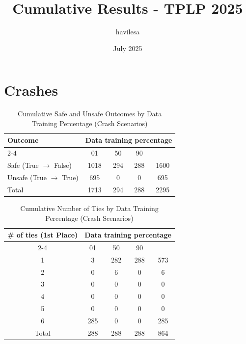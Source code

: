 \documentclass{article}
\title{Cumulative Results - TPLP 2025}
\author{havilesa}
\date{July 2025}
\begin{document}
\maketitle

\section{Crashes}
\begin{table}[h]
\centering
\caption{Cumulative Safe and Unsafe Outcomes by Data Training Percentage (Crash Scenarios)}
\begin{tabular}{l|ccc|c}
\toprule
\multirow{2}{*}{Outcome} & \multicolumn{5}{c|}{Data training percentage} & \multirow{2}{*}{Total} \\
\cmidrule{2-4}
 & 01 & 50 & 90 & \\
\midrule
Safe (True $\rightarrow$ False) & 1018 & 294 & 288 & 1600 \\ 
Unsafe (True $\rightarrow$ True) & 695 & 0 & 0 & 695 \\ 
\midrule
Total & 1713 & 294 & 288 & 2295 \\ 
\bottomrule
\end{tabular}
\end{table}

\begin{table}[h]
\centering
\caption{Cumulative Number of Ties by Data Training Percentage (Crash Scenarios)}
\begin{tabular}{c|ccc|c}
\toprule
\multirow{2}{*}{\# of ties (1st Place)} & \multicolumn{5}{c|}{Data training percentage} & \multirow{2}{*}{Total} \\
\cmidrule{2-4}
 & 01 & 50  & 90 & \\
\midrule
1 & 3 & 282 & 288 & 573 \\ 
2 & 0 & 6 & 0 & 6 \\ 
3 & 0 & 0 & 0 & 0 \\ 
4 & 0 & 0 & 0 & 0 \\ 
5 & 0 & 0 & 0 & 0 \\ 
6 & 285 & 0 & 0 & 285 \\ 
\midrule
Total & 288 & 288 & 288 & 864 \\ 
\bottomrule
\end{tabular}
\end{table}
\end{document}
